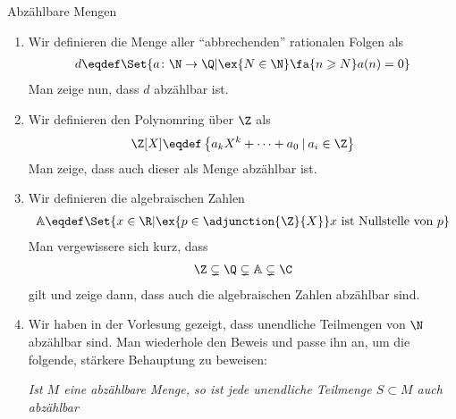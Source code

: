 \begin{exercise} Abzählbare Mengen
  \begin{enumerate}[label=(\alph*)]
  \item
    Wir definieren die Menge aller \enquote{abbrechenden} rationalen Folgen als
    \begin{equation*}
      \begin{split}
        d \eqdef \Set{a \colon \N \to \Q | \ex{N \in \N} \fa{n \geqslant N} a(n) = 0}
      \end{split}
    \end{equation*}
    Man zeige nun, dass $d$ abzählbar ist.

  \item
    Wir definieren den Polynomring über $\Z$ als
    \begin{equation*}
      \begin{split}
        \Z[X] \eqdef \left\{a_k X^k + \cdots + a_0 \:\arrowvert\: a_i \in \Z\right\}
      \end{split}
    \end{equation*}
    Man zeige, dass auch dieser als Menge abzählbar ist.

  \item
    Wir definieren die algebraischen Zahlen
    \begin{equation*}
      \begin{split}
        \mathbb{A} \eqdef \Set{x \in \R | \ex{p \in \adjunction{\Z}{X}} x
          \textnormal{ ist Nullstelle von } p}
      \end{split}
    \end{equation*}
    Man vergewissere sich kurz, dass
    \begin{equation*}
      \begin{split}
        \Z \subsetneq \Q \subsetneq \mathbb{A} \subsetneq \C
      \end{split}
    \end{equation*}
    gilt und zeige dann, dass auch die algebraischen Zahlen abzählbar sind.

  \item \label{itm:subset-of-countable-set}Wir haben in der Vorlesung gezeigt,
    dass unendliche Teilmengen von $\N$ abzählbar sind. Man wiederhole den
    Beweis und passe ihn an, um die folgende, stärkere Behauptung zu beweisen:
    \begin{theorem}
      \normalfont\itshape Ist $M$ eine abzählbare Menge, so ist jede unendliche
      Teilmenge $ S \subset M$ auch abzählbar
    \end{theorem}


\end{enumerate}
\end{exercise}
